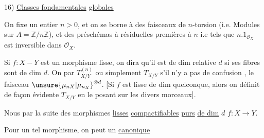 16) \uline{Classes fondamentales} \uline{globales}

On fixe un entier $n>0$, et on se  borne à des faisceaux de $n$-torsion (i.e. Modules sur $A=\mathbb Z/n\mathbb Z$), et des préschémas à  résiduelles premières à $n$ i.e tels que $n.1_{\mathcal O_X}$ est inversible dans $\mathcal O_X$.

Si $f:X\mathrel{-}Y$ est un morphisme lisse, on dira qu'il est  de dim relative $d$ si ses fibres sont  de dim $d$. On  par $T^{(n)}_{X/Y}$ ou simplement $T_{X/Y}$ s'il n'y a pas de confusion , le faisceau $\unsure{\mu_{nX}|\mu_{n_X}}^{\otimes d}$. [Si $f$ est lisse de dim  quelconque, alors on définit de façon évidente $T_{X/Y}$ en le posant sur les divers morceaux].

Nous  par la suite des morphismes \uline{lisses} \uline{compactifiables} \uline{purs} \uline{de dim} $d$ \qquad $f:X\longrightarrow Y$.

Pour un tel morphisme, on peut  un \uline{ canonique}

